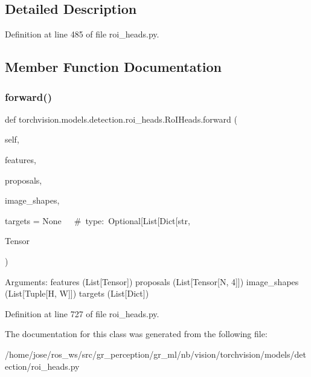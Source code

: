 \subsection{Detailed Description}


Definition at line 485 of file roi\+\_\+heads.\+py.



\subsection{Member Function Documentation}
\mbox{\label{classtorchvision_1_1models_1_1detection_1_1roi__heads_1_1RoIHeads_a710a4c0620e0f61e0ab57219755fadec}} 
\subsubsection{\texorpdfstring{forward()}{forward()}}
{\footnotesize\ttfamily def torchvision.\+models.\+detection.\+roi\+\_\+heads.\+Ro\+I\+Heads.\+forward (\begin{DoxyParamCaption}\item[{}]{self,  }\item[{}]{features,  }\item[{}]{proposals,  }\item[{}]{image\+\_\+shapes,  }\item[{}]{targets = {\ttfamily None~~~\#~type\+:~Optional\mbox{[}List\mbox{[}Dict\mbox{[}str},  }\item[{}]{Tensor }\end{DoxyParamCaption})}

\begin{DoxyVerb}Arguments:
    features (List[Tensor])
    proposals (List[Tensor[N, 4]])
    image_shapes (List[Tuple[H, W]])
    targets (List[Dict])
\end{DoxyVerb}
 

Definition at line 727 of file roi\+\_\+heads.\+py.



The documentation for this class was generated from the following file\+:\begin{DoxyCompactItemize}
\item 
/home/jose/ros\+\_\+ws/src/gr\+\_\+perception/gr\+\_\+ml/nb/vision/torchvision/models/detection/roi\+\_\+heads.\+py\end{DoxyCompactItemize}
